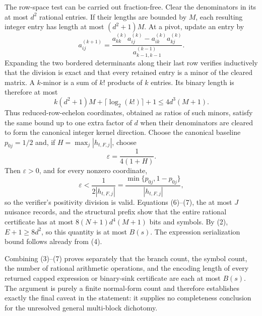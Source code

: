The row-space test can be carried out fraction-free.  Clear the denominators in its at most \(d^2\) rational entries.  If their lengths are bounded by \(M\), each resulting integer entry has length at most \((d^2+1)M\).  At a pivot, update an entry by
\[
 a^{(k+1)}_{ij}
 =\frac{a^{(k)}_{kk}a^{(k)}_{ij}-a^{(k)}_{ik}a^{(k)}_{kj}}
 {a^{(k-1)}_{k-1,k-1}}.
\]
Expanding the two bordered determinants along their last row verifies inductively that the division is exact and that every retained entry is a minor of the cleared matrix.  A \(k\)-minor is a sum of \(k!\) products of \(k\) entries.  Its binary length is therefore at most
\[
 k(d^2+1)M+\lceil\log_2(k!)\rceil+1
 \leq 4d^3(M+1). \tag{7}
\]
Thus reduced-row-echelon coordinates, obtained as ratios of such minors, satisfy the same bound up to one extra factor of \(d\) when their denominators are cleared to form the canonical integer kernel direction.  Choose the canonical baseline \(p_{0j}=1/2\) and, if \(H=\max_j|h_{t,F,j}|\), choose
\[
 \varepsilon=\frac{1}{4(1+H)}.
\]
Then \(\varepsilon>0\), and for every nonzero coordinate,
\[
 \varepsilon<\frac{1}{2|h_{t,F,j}|}
 =\frac{\min\{p_{0j},1-p_{0j}\}}{|h_{t,F,j}|},
\]
so the verifier's positivity division is valid.  Equations (6)--(7), the at most \(J\) nuisance records, and the structural prefix show that the entire rational certificate has at most \(8(N+1)d^4(M+1)\) bits and symbols.  By (2), \(E+1\geq8d^2\), so this quantity is at most \(B(s)\).  The expression serialization bound follows already from (4).

Combining (3)--(7) proves separately that the branch count, the symbol count, the number of rational arithmetic operations, and the encoding length of every returned capped expression or binary-sink certificate are each at most \(B(s)\).  The argument is purely a finite normal-form count and therefore establishes exactly the final caveat in the statement: it supplies no completeness conclusion for the unresolved general multi-block dichotomy.
